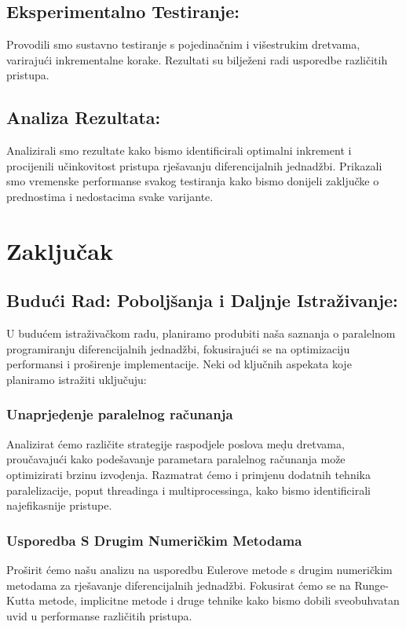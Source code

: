 \documentclass[conference]{IEEEtran}
\begin{document}
\subsection{Eksperimentalno Testiranje:}
Provodili smo sustavno testiranje s pojedinačnim i višestrukim dretvama, varirajući inkrementalne korake. Rezultati su bilježeni radi usporedbe različitih pristupa.
\subsection{Analiza Rezultata:}
Analizirali smo rezultate kako bismo identificirali optimalni inkrement i procijenili učinkovitost pristupa rješavanju diferencijalnih jednadžbi. Prikazali smo vremenske performanse svakog testiranja kako bismo donijeli zaključke o prednostima i nedostacima svake varijante.\newline



\section{Zaključak}

\subsection{Budući Rad: Poboljšanja i Daljnje Istraživanje:}
U budućem istraživačkom radu, planiramo produbiti naša saznanja o paralelnom programiranju diferencijalnih jednadžbi, fokusirajući se na optimizaciju performansi i proširenje implementacije. Neki od ključnih aspekata koje planiramo istražiti uključuju:

\subsubsection{Unaprje\d{d}enje paralelnog računanja}
Analizirat \'cemo razli\v{c}ite strategije raspodjele poslova me\d{d}u dretvama, prou\v{c}avaju\'ci kako pode\v{s}avanje parametara paralelnog ra\v{c}unanja mo\v{z}e optimizirati brzinu izvo\d{d}enja. Razmatrat \'cemo i primjenu dodatnih tehnika paralelizacije, poput threadinga i multiprocessinga, kako bismo identificirali najefikasnije pristupe.

\subsubsection{Usporedba S Drugim Numeričkim Metodama}

Proširit ćemo našu analizu na usporedbu Eulerove metode s drugim numeričkim metodama za rješavanje diferencijalnih jednadžbi. Fokusirat ćemo se na Runge-Kutta metode, implicitne metode i druge tehnike kako bismo dobili sveobuhvatan uvid u performanse različitih pristupa.
\end{document}
